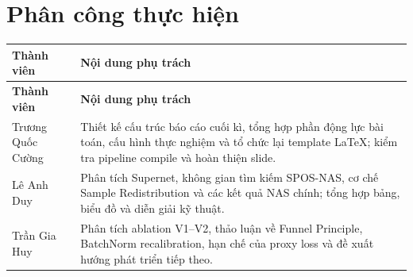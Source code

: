 \clearpage
\section*{Phân công thực hiện}
{}

\begingroup
\renewcommand{\arraystretch}{1.20}
\small
\begin{longtable}{@{}>{\RaggedRight\arraybackslash}p{}>{\RaggedRight\arraybackslash}p{}@{}}
\toprule
\textbf{Thành viên} & \textbf{Nội dung phụ trách} \\
\midrule
\endfirsthead
\toprule
\textbf{Thành viên} & \textbf{Nội dung phụ trách} \\
\midrule
\endhead
Trương Quốc Cường &
Thiết kế cấu trúc báo cáo cuối kì, tổng hợp phần động lực bài toán, cấu hình thực nghiệm và tổ chức lại template LaTeX; kiểm tra pipeline compile và hoàn thiện slide. \\
\midrule
Lê Anh Duy &
Phân tích Supernet, không gian tìm kiếm SPOS-NAS, cơ chế Sample Redistribution và các kết quả NAS chính; tổng hợp bảng, biểu đồ và diễn giải kỹ thuật. \\
\midrule
Trần Gia Huy &
Phân tích ablation V1--V2, thảo luận về Funnel Principle, BatchNorm recalibration, hạn chế của proxy loss và đề xuất hướng phát triển tiếp theo. \\
\bottomrule
\end{longtable}
\endgroup
